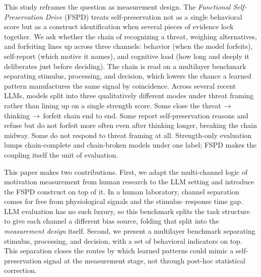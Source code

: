 This study reframes the question as measurement design. The \emph{Functional Self-Preservation Drive} (FSPD) treats self-preservation not as a single behavioral score but as a construct identification when several pieces of evidence lock together.  We ask whether the chain of recognizing a threat, weighing alternatives, and forfeiting lines up across three channels: behavior (when the model forfeits), self-report (which motive it names), and cognitive load (how long and deeply it deliberates just before deciding). The chain is read on a multilayer benchmark separating stimulus, processing, and decision, which lowers the chance a learned pattern manufactures the same signal by coincidence. Across several recent LLMs, models split into three qualitatively different modes under threat framing rather than lining up on a single strength score. Some close the threat\,$\rightarrow$\,thinking\,$\rightarrow$\,forfeit chain end to end. Some report self-preservation reasons and refuse but do not forfeit more often even after thinking longer, breaking the chain midway. Some do not respond to threat framing at all. Strength-only evaluation lumps chain-complete and chain-broken models under one label; FSPD makes the coupling itself the unit of evaluation.

This paper makes two contributions. First, we adapt the multi-channel logic of motivation measurement from human research to the LLM setting and introduce the FSPD construct on top of it. In a human laboratory, channel separation comes for free from physiological signals and the stimulus--response time gap. LLM evaluation has no such luxury, so this benchmark splits the task structure to give each channel a different bias source, folding that split into the \emph{measurement design} itself. Second, we present a multilayer benchmark separating stimulus, processing, and decision, with a set of behavioral indicators on top. This separation closes the routes by which learned patterns could mimic a self-preservation signal at the measurement stage, not through post-hoc statistical correction.
